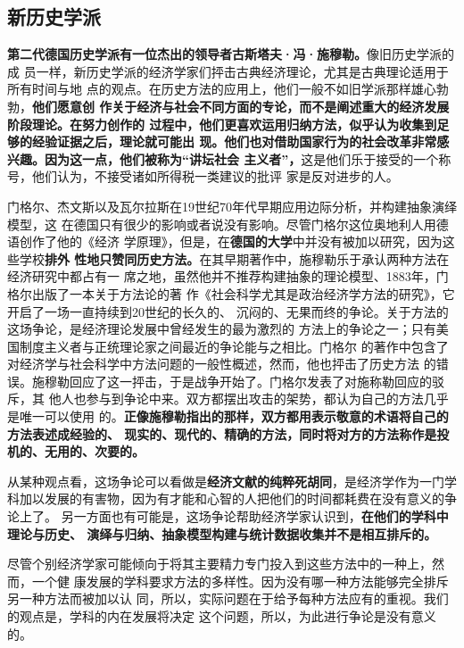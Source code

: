 \subsection{新历史学派}

\textbf{第二代德国历史学派有一位杰出的领导者古斯塔夫·冯·施穆勒。}像旧历史学派的成
员一样，新历史学派的经济学家们抨击古典经济理论，尤其是古典理论适用于所有时间与地
点的观点。在历史方法的应用上，他们一般不如旧学派那样雄心勃勃，\textbf{他们愿意创
  作关于经济与社会不同方面的专论，而不是阐述重大的经济发展阶段理论。在努力创作的
  过程中，他们更喜欢运用归纳方法，似乎认为收集到足够的经验证据之后，理论就可能出
  现。他们也对借助国家行为的社会改革非常感兴趣。因为这一点，他们被称为“讲坛社会
  主义者”，}这是他们乐于接受的一个称号，他们认为，不接受诸如所得税一类建议的批评
家是反对进步的人。

门格尔、杰文斯以及瓦尔拉斯在19世纪70年代早期应用边际分析，并构建抽象演绎模型，这
在德国只有很少的影响或者说没有影响。尽管门格尔这位奥地利人用德语创作了他的《经济
学原理》，但是，在\textbf{德国的大学}中并没有被加以研究，因为这些学校\textbf{排外
  性地只赞同历史方法。}在其早期著作中，施穆勒乐于承认两种方法在经济研究中都占有一
席之地，虽然他并不推荐构建抽象的理论模型、1883年，门格尔出版了一本关于方法论的著
作《社会科学尤其是政治经济学方法的研究》，它开启了一场一直持续到20世纪的长久的、
沉闷的、无果而终的争论。关于方法的这场争论，是经济理论发展中曾经发生的最为激烈的
方法上的争论之一；只有美国制度主义者与正统理论家之间最近的争论能与之相比。门格尔
的著作中包含了对经济学与社会科学中方法问题的一般性概述，然而，他也抨击了历史方法
的错误。施穆勒回应了这一抨击，于是战争开始了。门格尔发表了对施称勒回应的驳斥，其
他人也参与到争论中来。双方都摆出攻击的架势，都认为自己的方法几乎是唯一可以使用
的。\textbf{正像施穆勒指出的那样，双方都用表示敬意的术语将自己的方法表述成经验的、
  现实的、现代的、精确的方法，同时将对方的方法称作是投机的、无用的、次要的。}

从某种观点看，这场争论可以看做是\textbf{经济文献的纯粹死胡同}，是经济学作为一门学
科加以发展的有害物，因为有才能和心智的人把他们的时间都耗费在没有意义的争论上了。
另一方面也有可能是，这场争论帮助经济学家认识到，\textbf{在他们的学科中理论与历史、
  演绎与归纳、抽象模型构建与统计数据收集并不是相互排斥的。}

尽管个别经济学家可能倾向于将其主要精力专门投入到这些方法中的一种上，然而，一个健
康发展的学科要求方法的多样性。因为没有哪一种方法能够完全排斥另一种方法而被加以认
同，所以，实际问题在于给予每种方法应有的重视。我们的观点是，学科的内在发展将决定
这个问题，所以，为此进行争论是没有意义的。

